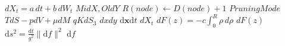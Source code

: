 \documentclass{article}
\begin{document}
$dX_t=a\,dt+b\,dW_t$
$MidX,OldY$
$R(node)\leftarrow D(node)+1$
$PruningMode$
$TdS-pdV+\mu dM$
$qKdS_{3}$
$dxdy$
$\mathrm{d}\mathbf{x}\mathrm{d}t$
$dX_t$
$dF(z)=-c\int_{0}^{R}\rho\,d\rho$
$dF(z)$
$\mathrm{d}s^2=\frac{\mathrm{d}t}{g^2}\|\mathrm{d}f\|^2$
$\mathrm{d}f$
\end{document}
